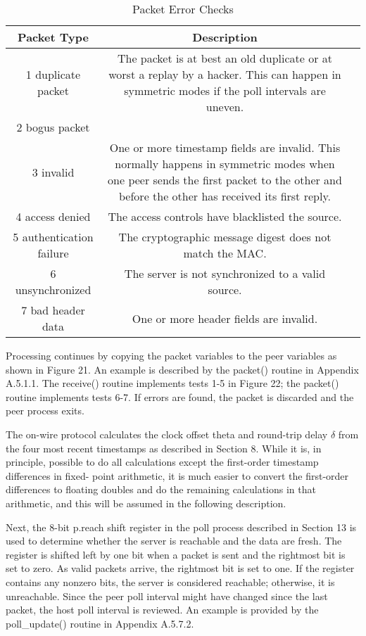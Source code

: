 \begin{description}
    \begin{table}[htb]
    \center
    \begin{tabular}{c | c | c}
    Packet Type & Description \\
    \hline
    \hline
    1 duplicate packet & The packet is at best an old duplicate or at worst a replay by a hacker. This can happen in symmetric modes if the poll intervals are uneven. \\
    2 bogus packet & \\
    3 invalid & One or more timestamp fields are invalid. This normally happens in symmetric modes when one peer sends the first packet to the other and before the other has received its first reply. \\
    4 access denied & The access controls have blacklisted the source. \\
    5 authentication failure & The cryptographic message digest does not match the MAC. \\
    6 unsynchronized & The server is not synchronized to a valid source. \\
    7 bad header data & One or more header fields are invalid. \\
    \hline
    \end{tabular}
    \label{packet_error_checks}
    \caption{Packet Error Checks}
    \end{table}

\end{description}

Processing continues by copying the packet variables to the peer
variables as shown in Figure 21. An example is described by the
packet() routine in Appendix A.5.1.1. The receive() routine
implements tests 1-5 in Figure 22; the packet() routine implements
tests 6-7. If errors are found, the packet is discarded and the peer
process exits.

The on-wire protocol calculates the clock offset theta and round-trip
delay $ \delta $ from the four most recent timestamps as described in
Section 8. While it is, in principle, possible to do all
calculations except the first-order timestamp differences in fixed-
point arithmetic, it is much easier to convert the first-order
differences to floating doubles and do the remaining calculations in
that arithmetic, and this will be assumed in the following
description.

Next, the 8-bit p.reach shift register in the poll process described
in Section 13 is used to determine whether the server is reachable
and the data are fresh. The register is shifted left by one bit when
a packet is sent and the rightmost bit is set to zero. As valid
packets arrive, the rightmost bit is set to one. If the register
contains any nonzero bits, the server is considered reachable;
otherwise, it is unreachable. Since the peer poll interval might
have changed since the last packet, the host poll interval is
reviewed. An example is provided by the poll\_update() routine in
Appendix A.5.7.2.


